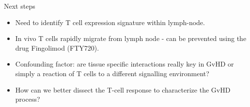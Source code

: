 \documentclass[final,hyperref={pdfpagelabels=false}]{beamer}
\begin{document}
\begin{frame}{}
\begin{columns}[t]
\begin{column}{.36\linewidth}
\begin{block}{Next steps}
\begin{itemize}
\item Need to identify T cell expression signature within lymph-node.
\item In vivo T cells rapidly migrate from lymph node - can be prevented using the drug Fingolimod (FTY720).
\item Confounding factor: are tissue specific interactions really key in GvHD or simply a reaction of T cells to a different signalling environment?
\item How can we better dissect the T-cell response to characterize the GvHD process?
\end{itemize}
\end{block}

\vspace{10cm}
\end{column}
\end{columns}
\end{frame}
\end{document}

